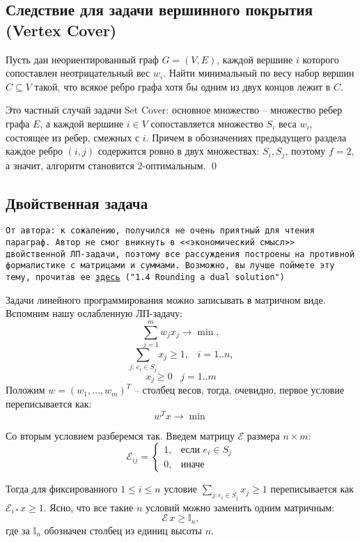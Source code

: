 \subsection{Следствие для задачи вершинного покрытия (Vertex Cover)}
 {Пусть дан неориентированный граф $G = (V, E)$, каждой вершине $i$ которого сопоставлен неотрицательный вес $w_i$. Найти минимальный по весу набор вершин $C \subseteq V$ такой, что всякое ребро графа хотя бы одним из двух концов лежит в $C$.} 

 Это частный случай задачи Set Cover: основное множество -- множество ребер графа $E$, а каждой вершине $i \in V$ сопоставляется множество $S_i$ веса $w_i$, состоящее из ребер, смежных с $i$. Причем в обозначениях предыдущего раздела каждое ребро $(i, j)$ содержится ровно в двух множествах: $S_i, S_j$, поэтому $f = 2$, а значит, алгоритм становится 2-оптимальным. \qed

\subsection{Двойственная задача}
\texttt{От автора: к сожалению, получился не очень приятный для чтения параграф. Автор не смог вникнуть в <<экономический смысл>> двойственной ЛП-задачи, поэтому все рассуждения построены на противной формалистике с матрицами и суммами. Возможно, вы лучше поймете эту тему, прочитав ее
\texttt{\href{https://www.designofapproxalgs.com/book.pdf}{\underline{здесь}}} 
("1.4 Rounding a dual solution")
}

Задачи линейного программирования можно записывать в матричном виде. Вспомним нашу ослабленную ЛП-задачу:
$$ \sum_{j=1}^m w_j x_j \rightarrow \min,$$
$$ \sum_{j:\, e_i \in S_j} x_j \geq 1, \;\;\; i=1..n,$$
$$ x_j \geq 0 \;\;\; j=1..m$$
Положим $w = (w_1, \ldots, w_m)^T$ -- столбец весов, тогда, очевидно, первое условие переписывается как: $$w^Tx \rightarrow \min$$

Со вторым условием разберемся так. Введем матрицу $\mathcal E$ размера $n \times m$:
$$
\mathcal{E}_{ij} = \begin{cases}
1, & \text{если } e_i \in S_j \\
0, & \text{иначе}
\end{cases}
$$

Тогда для фиксированного $1\leq i \leq n$ условие $\sum\limits_{j: e_i \in S_j} x_j \geq 1$ переписывается как $\mathcal{E}_{i*} x \geq 1$. Ясно, что все такие $n$ условий можно заменить одним матричным: $$\mathcal{E}\,x \geq \mathbb I_n,$$ где за $\mathbb I_n$ обозначен столбец из единиц высоты $n$.

